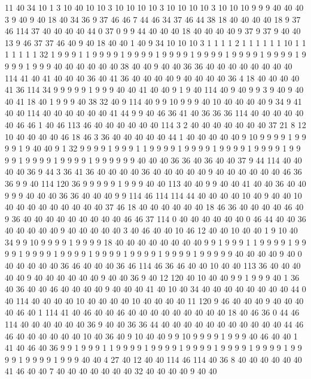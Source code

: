 11 40 34 10 1 3 10 40 10 10 3 10 10 10 10 3 10 10 10 10
3 10 10 10 9 9 9 40 40 40 3 9 40 9 40 18 40 34 36 9
37 46 46 7 44 46 34 37 46 44 38 18 40 40 40 40 18 9 37 46
114 37 40 40 40 40 44 0 37 0 9 9 44 40 40 40 18 40 40 40
40 9 37 9 37 9 40 40 13 9 46 37 37 46 40 9 40 18 40 40
1 40 9 34 10 10 10 3 1 1 1 1 2 1 1 1 1 1 1 10
1 1 1 1 1 1 1 32 1 9 9 9 1 1 9 9 9 9 1 9
9 9 9 1 9 9 9 9 1 9 9 9 9 1 9 9 9 9 1 9
9 9 9 1 9 9 9 9 1 9 9 9 40 40 40 40 40 40 38 40
40 9 40 40 36 36 40 40 40 40 40 40 40 40 114 41 40 41 40 40
40 36 40 41 36 40 40 40 40 9 40 40 40 40 36 4 18 40 40 40
40 41 36 114 34 9 9 9 9 9 1 9 9 9 40 40 41 40 40 9
1 9 40 114 40 9 40 9 9 3 9 40 9 40 40 41 18 40 1 9
9 9 40 38 32 40 9 114 40 9 9 10 9 9 9 40 10 40 40 40
40 9 34 9 41 40 40 114 40 40 40 40 40 40 41 44 9 9 40 46
36 41 40 36 36 36 114 40 40 40 40 40 40 46 46 1 40 46 113 46
40 40 40 40 40 40 114 3 2 40 40 40 40 40 40 40 37 21 8 12
10 40 40 40 40 46 18 46 3 36 40 40 40 40 40 44 1 40 40 40
40 40 9 10 9 9 9 9 1 9 9 9 9 1 9 40 40 9 1 32
9 9 9 9 1 9 9 9 1 1 9 9 9 9 1 9 9 9 9 1
9 9 9 9 1 9 9 9 9 1 9 9 9 9 1 9 9 9 9 1
9 9 9 9 1 9 9 9 9 9 9 40 40 40 36 36 40 36 40 40
37 9 44 114 40 40 40 40 36 9 44 3 36 41 36 40 40 40 40 36
40 40 40 40 40 9 40 40 40 40 40 40 46 36 36 9 9 40 114 120
36 9 9 9 9 9 1 9 9 9 40 40 113 40 40 9 9 40 40 41
40 40 36 40 40 9 9 9 40 40 40 36 36 40 40 40 9 9 114 46
114 114 44 40 40 40 40 10 40 9 40 40 10 40 40 40 40 40 40 40
40 40 37 46 18 40 40 40 40 40 40 18 46 36 40 40 40 40 46 40
9 36 40 40 40 40 40 40 40 40 40 46 46 37 114 0 40 40 40 40
40 40 0 46 44 40 40 36 40 40 40 40 40 9 40 40 40 40 40 3
40 46 40 40 10 46 12 40 40 10 40 40 1 9 10 40 34 9 9 10
9 9 9 9 1 9 9 9 9 18 40 40 40 40 40 40 40 40 9 9
1 9 9 9 1 1 9 9 9 9 1 9 9 9 9 1 9 9 9 9
1 9 9 9 9 1 9 9 9 9 1 9 9 9 9 1 9 9 9 9
1 9 9 9 9 9 40 40 40 40 9 40 0 40 40 40 40 40 36 46
40 40 40 36 46 114 46 36 46 40 40 10 40 40 113 36 40 40 40 40
40 9 40 40 40 40 40 40 9 40 40 36 9 40 12 120 40 10 40 40
9 9 1 9 9 9 40 1 36 40 36 40 40 46 40 40 40 40 9 40
40 40 41 40 10 40 34 40 40 40 40 40 40 40 40 44 0 40 114 40
40 40 40 10 40 40 40 40 10 40 40 40 40 11 120 9 46 40 40 40
9 40 40 40 40 46 40 1 114 41 40 46 40 40 46 40 40 40 40 40
40 40 40 40 18 40 46 36 0 44 46 114 40 40 40 40 40 40 36 9
40 40 36 36 44 40 40 40 40 40 40 40 40 40 40 40 44 46 46 40
40 40 40 40 40 10 40 36 40 9 10 40 40 9 9 10 9 9 9 9
1 9 9 9 40 46 40 40 1 41 40 46 40 36 9 9 1 9 9 9
1 1 9 9 9 9 1 9 9 9 9 1 9 9 9 9 1 9 9 9
9 1 9 9 9 9 1 9 9 9 9 1 9 9 9 9 1 9 9 9
40 40 4 27 40 12 40 40 114 46 114 40 36 8 40 40 40 40 40 40
41 46 40 40 7 40 40 40 40 40 40 40 32 40 40 40 40 9 40 40
